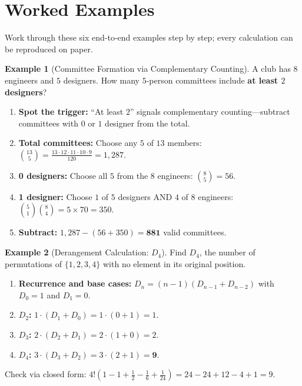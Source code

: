\documentclass[11pt,a4paper]{article}
\theoremstyle{definition}
\newtheorem{example}{Example}[section]
\begin{document}
\section{Worked Examples}

Work through these six end-to-end examples step by step; every calculation can be reproduced on paper.

\begin{example}[Committee Formation via Complementary Counting]
A club has $8$ engineers and $5$ designers. How many $5$-person committees include \textbf{at least $2$ designers}?
\begin{enumerate}
    \item \textbf{Spot the trigger:} ``At least $2$'' signals complementary counting---subtract committees with $0$ or $1$ designer from the total.
    \item \textbf{Total committees:} Choose any $5$ of $13$ members: $\binom{13}{5} = \frac{13 \cdot 12 \cdot 11 \cdot 10 \cdot 9}{120} = 1{,}287$.
    \item \textbf{0 designers:} Choose all $5$ from the $8$ engineers: $\binom{8}{5} = 56$.
    \item \textbf{1 designer:} Choose $1$ of $5$ designers AND $4$ of $8$ engineers: $\binom{5}{1}\binom{8}{4} = 5 \times 70 = 350$.
    \item \textbf{Subtract:} $1{,}287 - (56 + 350) = \mathbf{881}$ valid committees.
\end{enumerate}
\end{example}

\begin{example}[Derangement Calculation: $D_4$]
Find $D_4$, the number of permutations of $\{1, 2, 3, 4\}$ with no element in its original position.
\begin{enumerate}
    \item \textbf{Recurrence and base cases:} $D_n = (n - 1)(D_{n-1} + D_{n-2})$ with $D_0 = 1$ and $D_1 = 0$.
    \item \textbf{$D_2$:} $1 \cdot (D_1 + D_0) = 1 \cdot (0 + 1) = 1$.
    \item \textbf{$D_3$:} $2 \cdot (D_2 + D_1) = 2 \cdot (1 + 0) = 2$.
    \item \textbf{$D_4$:} $3 \cdot (D_3 + D_2) = 3 \cdot (2 + 1) = \mathbf{9}$.
\end{enumerate}
Check via closed form: $4!(1 - 1 + \frac{1}{2} - \frac{1}{6} + \frac{1}{24}) = 24 - 24 + 12 - 4 + 1 = 9$.
\end{example}
\end{document}
